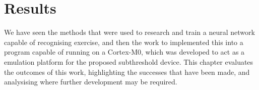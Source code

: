 \chapter{Results}

We have seen the methods that were used to research and train a neural network capable of recognising exercise, and then the work to implemented this into a program capable of running on a Cortex-M0, which was developed to act as a emulation platform for the proposed subthreshold device. This chapter evaluates the outcomes of this work, highlighting the successes that have been made, and analysising where further development may be required.



